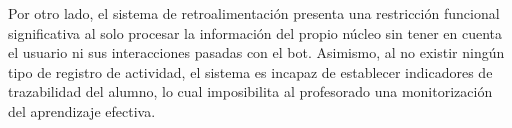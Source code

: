 \documentclass[a4paper,12pt,twoside,final]{book}
\begin{document}
Por otro lado, el sistema de retroalimentación presenta una restricción funcional significativa al solo procesar la información del propio núcleo sin tener en cuenta el usuario ni sus interacciones pasadas con el bot. Asimismo, al no existir ningún tipo de registro de actividad, el sistema es incapaz de establecer indicadores de trazabilidad del alumno, lo cual imposibilita al profesorado una monitorización del aprendizaje efectiva.

\end{document}

